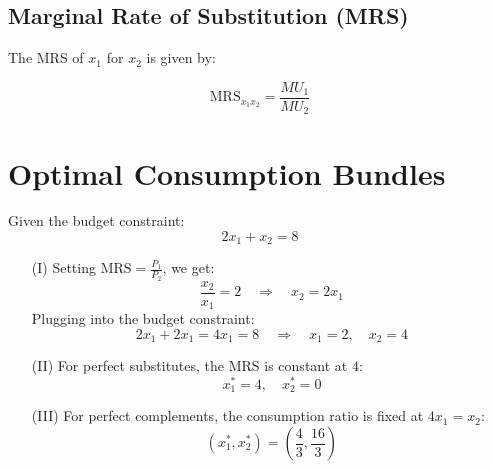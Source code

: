 \documentclass[a4paper,12pt]{article}
\begin{document}
\subsection{Marginal Rate of Substitution (MRS)}

The MRS of $x_1$ for $x_2$ is given by:

\[
\text{MRS}_{x_1x_2} = \frac{MU_1}{MU_2}
\]

\section{Optimal Consumption Bundles}

Given the budget constraint:
\[
2x_1 + x_2 = 8
\]

\begin{enumerate}
    \item[(I)] Setting $\text{MRS} = \frac{P_1}{P_2}$, we get:
    \[
    \frac{x_2}{x_1} = 2 \quad \Rightarrow \quad x_2 = 2x_1
    \]
    Plugging into the budget constraint:
    \[
    2x_1 + 2x_1 = 4x_1 = 8 \quad \Rightarrow \quad x_1 = 2, \quad x_2 = 4
    \]

    \item[(II)] For perfect substitutes, the MRS is constant at $4$:
    \[
    x_1^* = 4, \quad x_2^* = 0
    \]

    \item[(III)] For perfect complements, the consumption ratio is fixed at $4x_1 = x_2$:
    \[
    (x_1^*, x_2^*) = \left(\frac{4}{3}, \frac{16}{3} \right)
    \]
\end{enumerate}
\end{document}
